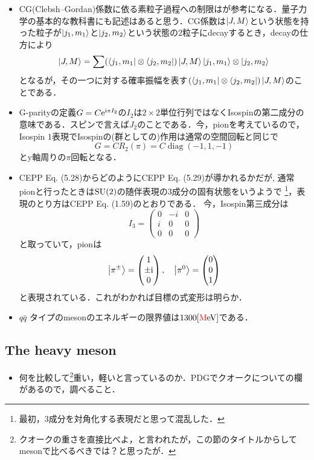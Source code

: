 \begin{itemize}
		\item CG(Clebsh--Gordan)係数に依る素粒子過程への制限は\cite[Chap.4]{BB03663366}が参考になる．量子力学の基本的な教科書にも記述はあると思う．CG係数は$\ket{J, M} $という状態を持った粒子が$\ket{j_1, m_1} $と$\ket{j_2, m_2} $という状態の$2 $粒子にdecayするとき，decayの仕方により
				\begin{equation}
						\ket{J, M} = \sum (\bra{j_1, m_1}\otimes\bra{j_2, m_2})\ket{J, M} \ket{j_1, m_1}\otimes\ket{j_2, m_2}
				\end{equation}
				となるが，その一つに対する確率振幅を表す$ (\bra{j_1, m_1}\otimes\bra{j_2, m_2})\ket{J, M}$のことである．
		\item G-parityの定義$G = C\mathrm{e}^{\mathrm{i}\pi I_2} $の$I_2 $は$2\times 2 $単位行列ではなくIsospinの第二成分の意味である．スピンで言えば$J_2 $のことである．今，pionを考えているので，Isospin $1 $表現でIsospinの(群としての)作用は通常の空間回転と同じで
				\begin{equation}
						G = CR_2(\pi)  = C\operatorname{diag}(-1, 1, -1)
				\end{equation}
				とy軸周りの$\pi $回転となる．
		\item CEPP Eq. (5.28)からどのようにCEPP Eq. (5.29)が導かれるかだが,
				通常pionと行ったときは$\mathrm{SU}(2) $の随伴表現の$3 $成分の固有状態をいうようで
				\footnote{最初，$3 $成分を対角化する表現だと思って混乱した．}\cite{Bransden2015}，表現のとり方はCEPP Eq. (1.59)のとおりである．
				今，Isospin第三成分は
				\begin{equation}
						I_3 = \begin{pmatrix}
								0 & -i & 0\\
								i & 0 & 0\\
								0 & 0 & 0
						\end{pmatrix}
				\end{equation}
				と取っていて，pionは
				\begin{equation}
						\ket{\pi^{\pm}} = 
						\begin{pmatrix}
								1\\\pm \mathrm{i}\\0
						\end{pmatrix},\quad
						\ket{\pi^{0}} = 
						\begin{pmatrix}
								0\\0\\1
						\end{pmatrix}
				\end{equation}
				と表現されている．これがわかれば目標の式変形は明らか．
		\item $q\bar{q} $ タイプのmesonのエネルギーの限界値は$1300\mathrm{[\textcolor{red}{M}eV]} $である．
\end{itemize}
\subsection{The heavy meson}
\begin{itemize}
		\item 何を比較して\footnote{クオークの重さを直接比べよ，と言われたが，この節のタイトルからしてmesonで比べるべきでは？と思ったが．}重い，軽いと言っているのか．PDGでクオークについての欄があるので，調べること．
\end{itemize}
